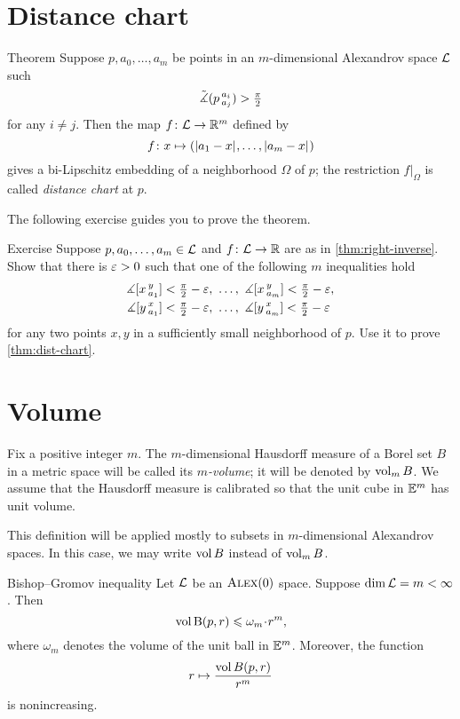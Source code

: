 \section{Distance chart}

\begin{thm}{Theorem}\label{thm:dist-chart}
Suppose $p,a_0,\dots,a_m$ be points in an $m$-dimensional Alexandrov space $\mathcal{L}$ such
\[\tilde\measuredangle(p\,{}^{a_i}_{a_j})>\tfrac\pi2\]
for any $i\ne j$.
Then the map $f\colon\mathcal{L}\to\mathbb{R}^m$ defined by
\[f\:x\mapsto (\dist{a_1}{x}{},\dots,\dist{a_m}{x}{})\]
gives a bi-Lipschitz embedding of a neighborhood $\Omega$ of $p$;
the restriction $f|_\Omega$ is called \emph{distance chart} at $p$.
\end{thm}

The following exercise guides you to prove the theorem.

\begin{thm}{Exercise}\label{ex:proof-dist-chart}
Suppose $p,a_0,\dots,a_m\in\mathcal{L}$ and $f\colon\mathcal{L}\to\mathbb{R}$ are as in \ref{thm:right-inverse}.
Show that there is $\varepsilon>0$ such that one of the following $m$ inequalities hold
\begin{align*}
\measuredangle[x\,{}^{y}_{a_1}]&<\tfrac\pi2-\varepsilon,\ \dots,\  \measuredangle[x\,{}^{y}_{a_m}]<\tfrac\pi2-\varepsilon,
\\
\measuredangle[y\,{}^{x}_{a_1}]&<\tfrac\pi2-\varepsilon,\ \dots,\ \measuredangle[y\,{}^{x}_{a_m}]<\tfrac\pi2-\varepsilon
\end{align*}
for any two points $x,y$ in a sufficiently small neighborhood of $p$.
Use it to prove \ref{thm:dist-chart}.
\end{thm}

\section{Volume}

Fix a positive integer $m$.
The $m$-dimensional Hausdorff measure of a Borel set $B$ in a metric space will be called its \emph{$m$-volume}; it will be denoted by $\operatorname{\rm vol}\nolimits_m B$.
We assume that the Hausdorff measure is calibrated so that the unit cube in $\mathbb{E}^m$ has unit volume.

This definition will be applied mostly to subsets in $m$-dimensional Alexandrov spaces.
In this case, we may write $\operatorname{\rm vol}\nolimits B$ instead of $\operatorname{\rm vol}\nolimits_m B$.


\begin{thm}{Bishop--Gromov inequality}\label{inq:BG}
Let $\mathcal{L}$ be an $\textsc{Alex}(0)$ space.
Suppose $\operatorname{\rm dim}\nolimits \mathcal{L}=m<\infty$.
Then 
\[\vol \oBall(p,r)\le \omega_m\cdot r^m,\]
where $\omega_m$ denotes the volume of the unit ball in $\mathbb{E}^m$.
Moreover, the function 
\[r\mapsto \frac{\operatorname{\rm vol}\nolimits B(p,r)}{r^m}\]
is nonincreasing.
\end{thm}

